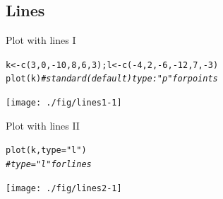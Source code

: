 \documentclass[xcolor=table,           xcolor=dvipsnames]{beamer}\usepackage[]{graphicx}\usepackage[]{color}
\makeatletter
\newcommand{\hlnum}[1]{\textcolor[rgb]{0,0,0}{#1}}
\newcommand{\hlstr}[1]{\textcolor[rgb]{0.545,0.137,0.137}{#1}}
\newcommand{\hlcom}[1]{\textcolor[rgb]{0,0.392,0}{\textit{#1}}}
\newcommand{\hlopt}[1]{\textcolor[rgb]{0,0,0}{#1}}
\newcommand{\hlstd}[1]{\textcolor[rgb]{0,0,0}{#1}}
\newcommand{\hlkwb}[1]{\textcolor[rgb]{0,0,0}{#1}}
\newcommand{\hlkwc}[1]{\textcolor[rgb]{1,0,1}{#1}}
\newcommand{\hlkwd}[1]{\textcolor[rgb]{0,0,1}{#1}}
\newenvironment{kframe}{%
 \def\at@end@of@kframe{}%
 \ifinner\ifhmode%
  \def\at@end@of@kframe{\end{minipage}}%
  \begin{minipage}{\columnwidth}%
 \fi\fi%
 \def\FrameCommand##1{\hskip\@totalleftmargin \hskip-\fboxsep
 \colorbox{shadecolor}{##1}\hskip-\fboxsep
     \hskip-\linewidth \hskip-\@totalleftmargin \hskip\columnwidth}%
 \MakeFramed {\advance\hsize-\width
   \@totalleftmargin\z@ \linewidth\hsize
   \@setminipage}}%
 {\par\unskip\endMakeFramed%
 \at@end@of@kframe}
\newenvironment{knitrout}{}{} %
\makeatother
\begin{document}
\subsection{Lines}

\begin{frame}[fragile]{Plot with lines I}
\begin{knitrout}
\color{fgcolor}\begin{kframe}
\begin{alltt}
\hlstd{k} \hlkwb{<-} \hlkwd{c}\hlstd{(}\hlnum{3}\hlstd{,}\hlnum{0}\hlstd{,}\hlopt{-}\hlnum{10}\hlstd{,}\hlnum{8}\hlstd{,}\hlnum{6}\hlstd{,}\hlnum{3}\hlstd{)   ; l} \hlkwb{<-} \hlkwd{c}\hlstd{(}\hlopt{-}\hlnum{4}\hlstd{,}\hlnum{2}\hlstd{,}\hlopt{-}\hlnum{6}\hlstd{,}\hlopt{-}\hlnum{12}\hlstd{,}\hlnum{7}\hlstd{,}\hlopt{-}\hlnum{3}\hlstd{)}
\hlkwd{plot}\hlstd{(k)}  \hlcom{# standard (default) type: "p" for points}
\end{alltt}
\end{kframe}

{\centering \texttt{[image: ./fig/lines1-1]} 

}



\end{knitrout}
\end{frame}


\begin{frame}[fragile]{Plot with lines II}
\begin{knitrout}
\color{fgcolor}\begin{kframe}
\begin{alltt}
\hlkwd{plot}\hlstd{(k,} \hlkwc{type}\hlstd{=}\hlstr{"l"}\hlstd{)}
\hlcom{# type="l" for lines}
\end{alltt}
\end{kframe}

{\centering \texttt{[image: ./fig/lines2-1]} 

}



\end{knitrout}
\end{frame}
\end{document}
